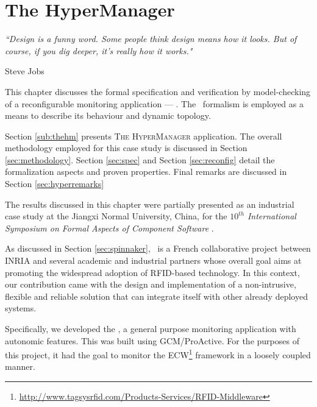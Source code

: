 
\chapter{The HyperManager} 
\label{chap:hyper} 

\epigraph{\textit{“Design is a funny word. Some people think design means how it looks. 
                             But of course, if you dig deeper, it's really how it works."}}{Steve Jobs}


\minitoc



 This chapter discusses the formal specification and verification by model-checking 
 of a reconfigurable monitoring application --- \thehm. The \pnets\ formalism is 
 employed as a means to describe its behaviour and dynamic topology. 
 
	Section \ref{sub:thehm} presents \textsc{The HyperManager} application. The overall
	methodology employed for this case study is discussed in Section \ref{sec:methodology}.
	Section \ref{sec:spec} and Section \ref{sec:reconfig} detail the formalization aspects and
	proven properties. Final remarks
	are discussed in Section \ref{sec:hyperremarks}
 
	The results discussed in this chapter were partially presented as an industrial case study at the Jiangxi Normal University, China, for the $10^{th}$ \textit{International Symposium on Formal Aspects of Component Software} \cite{GASHENMAD:FACS13}.






  As discussed in Section \ref{sec:spinnaker}, \spinnaker\ is a French collaborative
  project between INRIA and several academic and industrial partners whose overall goal
  aims at promoting the widespread adoption of \ac{RFID}-based technology. In this context,
  our contribution came with the design and implementation of a non-intrusive, flexible and 
  reliable solution that can integrate itself with other already deployed systems. 
  	
	Specifically, we developed the \thehm, a general purpose monitoring
	application with autonomic features. This was built using GCM/ProActive. For the purposes
	of this project, it had the goal to monitor the \ac{ECW}\footnote{\url{http://www.tagsysrfid.com/Products-Services/RFID-Middleware}}  
	framework in a loosely coupled manner.
	
